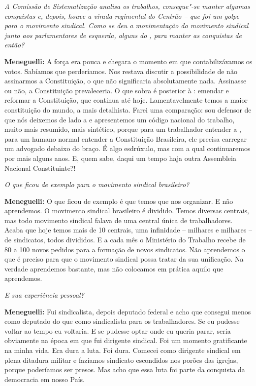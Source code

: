 \emph{A Comissão de Sistematização analisa os trabalhos, consegue"-se
manter algumas conquistas e, depois, houve a virada regimental do
Centrão -- que foi um golpe para o movimento sindical. Como se deu a
movimentação do movimento sindical junto aos parlamentares de esquerda,
alguns do , para manter as conquistas de então?}

\textbf{Meneguelli:} A força era pouca e chegara o momento em que
contabilizávamos os votos. Sabíamos que perderíamos. Nos restava
discutir a possibilidade de não assinarmos a Constituição, o que não
significaria absolutamente nada. Assinasse ou não, a Constituição
prevaleceria. O que sobra é posterior à : emendar e reformar a
Constituição, que continua até hoje. Lamentavelmente temos a maior
constituição do mundo, a mais detalhista. Farei uma comparação: sou
defensor de que nós deixemos de lado a  e apresentemos um código
nacional do trabalho, muito mais resumido, mais sintético, porque para
um trabalhador entender a , para um humano normal entender a
Constituição Brasileira, ele precisa carregar um advogado debaixo do
braço. É algo esdrúxulo, mas com a qual continuaremos por mais alguns
anos. E, quem sabe, daqui um tempo haja outra Assembleia Nacional
Constituinte?!

\emph{O que ficou de exemplo para o movimento sindical brasileiro?}

\textbf{Meneguelli:} O que ficou de exemplo é que temos que nos
organizar. E não aprendemos. O movimento sindical brasileiro é dividido.
Temos diversas centrais, mas todo movimento sindical falava de uma
central única de trabalhadores. Acaba que hoje temos mais de 10
centrais, uma infinidade -- milhares e milhares -- de sindicatos, todos
divididos. E a cada mês o Ministério do Trabalho recebe de 80 a 100
novos pedidos para a formação de novos sindicatos. Não aprendemos o que
é preciso para que o movimento sindical possa tratar da sua unificação.
Na verdade aprendemos bastante, mas não colocamos em prática aquilo que
aprendemos.

\emph{E sua experiência pessoal?}

\textbf{Meneguelli:} Fui sindicalista, depois deputado federal e acho
que consegui menos como deputado do que como sindicalista para os
trabalhadores. Se eu pudesse voltar ao tempo eu voltaria. E se pudesse
optar onde eu queria parar, seria obviamente na época em que fui
dirigente sindical. Foi um momento gratificante na minha vida. Era dura
a luta. Foi dura. Comecei como dirigente sindical em plena ditadura
militar e fazíamos sindicato escondidos nos porões das igrejas, porque
poderíamos ser presos. Mas acho que essa luta foi parte da conquista da
democracia em nosso País.


